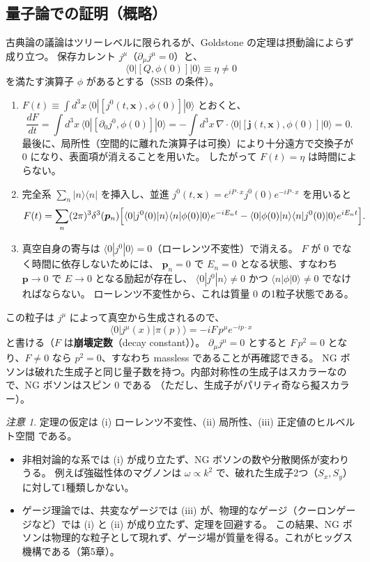 \documentclass[uplatex,dvipdfmx,a4paper,11pt,openany]{jsbook}
\newcommand{\term}[2]{\textbf{#1}（#2）}
\numberwithin{equation}{chapter}
\theoremstyle{definition}
\theoremstyle{plain}
\theoremstyle{remark}
\newtheorem{remark}{注意}[chapter]
\begin{document}
\subsection{量子論での証明（概略）}
古典論の議論はツリーレベルに限られるが、Goldstone の定理は摂動論によらず成り立つ。
保存カレント $j^\mu$（$\partial_\mu j^\mu=0$）と、
\begin{equation}
\langle0|[Q,\phi(0)]|0\rangle\equiv\eta\ne0
\label{eq:SSB-condition}
\end{equation}
を満たす演算子 $\phi$ があるとする（SSB の条件）。
\begin{enumerate}
    \item $F(t)\equiv\int d^3x\,\langle0|[j^0(t,\bm x),\phi(0)]|0\rangle$ とおくと、
    \[
    \frac{dF}{dt}=\int d^3x\,\langle0|[\partial_0j^0,\phi(0)]|0\rangle=-\int d^3x\,\nabla\cdot\langle0|[\bm j(t,\bm x),\phi(0)]|0\rangle=0 .
    \]
    最後に、局所性（空間的に離れた演算子は可換）により十分遠方で交換子が 0 になり、表面項が消えることを用いた。
    したがって $F(t)=\eta$ は時間によらない。
    \item 完全系 $\sum_n|n\rangle\langle n|$ を挿入し、並進 $j^0(t,\bm x)=e^{iP\cdot x}j^0(0)e^{-iP\cdot x}$ を用いると
    \[
    F(t)=\sum_n(2\pi)^3\delta^3(\bm p_n)\Bigl[\langle0|j^0(0)|n\rangle\langle n|\phi(0)|0\rangle e^{-iE_nt}
    -\langle0|\phi(0)|n\rangle\langle n|j^0(0)|0\rangle e^{iE_nt}\Bigr].
    \]
    \item 真空自身の寄与は $\langle0|j^0|0\rangle=0$（ローレンツ不変性）で消える。
    $F$ が 0 でなく時間に依存しないためには、
    $\bm p_n=0$ で $E_n=0$ となる状態、すなわち $\bm p\to0$ で $E\to0$ となる励起が存在し、
    $\langle0|j^0|n\rangle\ne0$ かつ $\langle n|\phi|0\rangle\ne0$ でなければならない。
    ローレンツ不変性から、これは質量 0 の1粒子状態である。
\end{enumerate}
この粒子は $j^\mu$ によって真空から生成されるので、
\begin{equation}
\langle0|j^\mu(x)|\pi(p)\rangle=-iF\,p^\mu e^{-ip\cdot x}
\label{eq:NG-decay-constant}
\end{equation}
と書ける（$F$ は\term{崩壊定数}{decay constant}）。
$\partial_\mu j^\mu=0$ とすると $F\,p^2=0$ となり、$F\ne0$ なら $p^2=0$、すなわち massless であることが再確認できる。
NG ボソンは破れた生成子と同じ量子数を持つ。内部対称性の生成子はスカラーなので、NG ボソンはスピン 0 である
（ただし、生成子がパリティ奇なら擬スカラー）。
\begin{remark}
定理の仮定は (i) ローレンツ不変性、(ii) 局所性、(iii) 正定値のヒルベルト空間 である。
\begin{itemize}
    \item 非相対論的な系では (i) が成り立たず、NG ボソンの数や分散関係が変わりうる。
    例えば強磁性体のマグノンは $\omega\propto k^2$ で、破れた生成子2つ（$S_x,S_y$）に対して1種類しかない。
    \item ゲージ理論では、共変なゲージでは (iii) が、物理的なゲージ（クーロンゲージなど）では (i) と (ii) が成り立たず、定理を回避する。
    この結果、NG ボソンは物理的な粒子として現れず、ゲージ場が質量を得る。これがヒッグス機構である（第5章）。
\end{itemize}
\end{remark}
\end{document}
